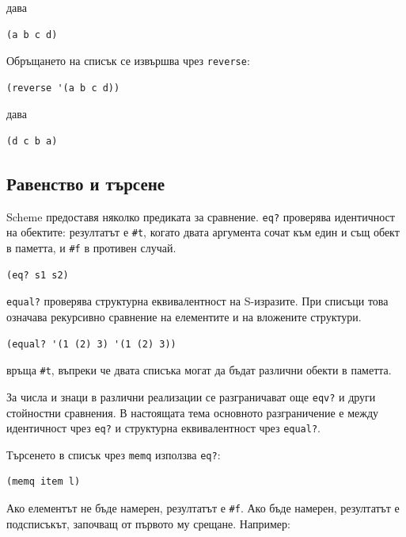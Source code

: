 дава

\begin{verbatim}
(a b c d)
\end{verbatim}

Обръщането на списък се извършва чрез \texttt{reverse}:

\begin{verbatim}
(reverse '(a b c d))
\end{verbatim}

дава

\begin{verbatim}
(d c b a)
\end{verbatim}

\subsection{Равенство и търсене}\label{s:20.2.4}

Scheme предоставя няколко предиката за сравнение. \texttt{eq?} проверява идентичност на обектите: резултатът е \texttt{\#t}, когато двата аргумента сочат към един и същ обект в паметта, и \texttt{\#f} в противен случай.

\begin{verbatim}
(eq? s1 s2)
\end{verbatim}

\texttt{equal?} проверява структурна еквивалентност на S-изразите. При списъци това означава рекурсивно сравнение на елементите и на вложените структури.

\begin{verbatim}
(equal? '(1 (2) 3) '(1 (2) 3))
\end{verbatim}

връща \texttt{\#t}, въпреки че двата списъка могат да бъдат различни обекти в паметта.

\begin{supp}[Бележка]
За числа и знаци в различни реализации се разграничават още \texttt{eqv?} и други стойностни сравнения. В настоящата тема основното разграничение е между идентичност чрез \texttt{eq?} и структурна еквивалентност чрез \texttt{equal?}.
\end{supp}

Търсенето в списък чрез \texttt{memq} използва \texttt{eq?}:

\begin{verbatim}
(memq item l)
\end{verbatim}

Ако елементът не бъде намерен, резултатът е \texttt{\#f}. Ако бъде намерен, резултатът е подсписъкът, започващ от първото му срещане. Например:

